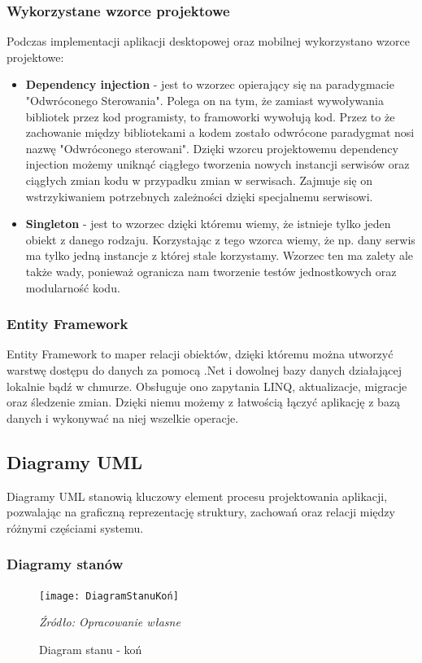 \documentclass[12pt,oneside]{report}
\begin{document}
\subsubsection{Wykorzystane wzorce projektowe}
Podczas implementacji aplikacji desktopowej oraz mobilnej wykorzystano wzorce projektowe:
\begin{itemize}
\item \textbf{Dependency injection} - jest to wzorzec opierający się na paradygmacie "Odwróconego Sterowania". Polega on na tym, że zamiast wywoływania bibliotek przez kod programisty, to framoworki wywołują kod. Przez to że zachowanie między bibliotekami a kodem zostało odwrócone paradygmat nosi nazwę "Odwróconego sterowani".
Dzięki wzorcu projektowemu dependency injection możemy uniknąć ciągłego tworzenia nowych instancji serwisów oraz ciągłych zmian kodu w przypadku zmian w serwisach. Zajmuje się on wstrzykiwaniem potrzebnych zależności dzięki specjalnemu serwisowi.\cite{DI}
\item \textbf{Singleton} - jest to wzorzec dzięki któremu wiemy, że istnieje tylko jeden obiekt z danego rodzaju. Korzystając z tego wzorca wiemy, że np. dany serwis ma tylko jedną instancje z której stale korzystamy. Wzorzec ten ma zalety ale także wady, ponieważ ogranicza nam tworzenie testów jednostkowych oraz modularność kodu.
\end{itemize}
\subsubsection{Entity Framework}
Entity Framework to maper relacji obiektów, dzięki któremu można utworzyć warstwę dostępu do danych za pomocą .Net i dowolnej bazy danych działającej lokalnie bądź w chmurze. Obsługuje ono zapytania LINQ, aktualizacje, migracje oraz śledzenie zmian. Dzięki niemu możemy z łatwością łączyć aplikację z bazą danych i wykonywać na niej wszelkie operacje. \cite{EntityFramework}
\subsection{Diagramy UML}
Diagramy UML stanowią kluczowy element procesu projektowania aplikacji, pozwalając na graficzną reprezentację struktury, zachowań oraz relacji między różnymi częściami systemu.
\subsubsection{Diagramy stanów}
\begin{figure}[H]
	\centering
	\texttt{[image: DiagramStanuKoń]}
	\caption{Diagram stanu - koń}
	\textit{Źródło: Opracowanie własne}
	\label{DiagramStanuKoń}
\end{figure}
\end{document}
